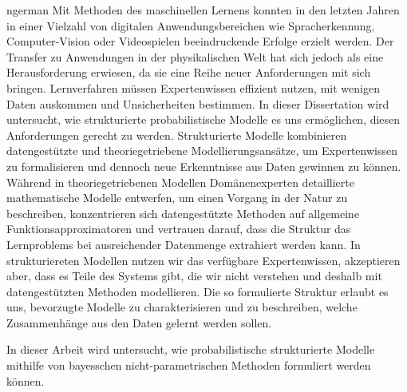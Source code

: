 \begin{titlepage}
    
\end{titlepage}

\begin{titlepage}
    
\end{titlepage}

\begin{Abstract}{ngerman}
    Mit Methoden des maschinellen Lernens konnten in den letzten Jahren in einer Vielzahl von digitalen Anwendungsbereichen wie Spracherkennung, Computer-Vision oder Videospielen beeindruckende Erfolge erzielt werden.
    Der Transfer zu Anwendungen in der physikalischen Welt hat sich jedoch als eine Herausforderung erwiesen, da sie eine Reihe neuer Anforderungen mit sich bringen.
    Lernverfahren müssen Expertenwissen effizient nutzen, mit wenigen Daten auskommen und Unsicherheiten bestimmen.
    In dieser Dissertation wird untersucht, wie strukturierte probabilistische Modelle es uns ermöglichen, diesen Anforderungen gerecht zu werden.
    Strukturierte Modelle kombinieren datengestützte und theoriegetriebene Modellierungsansätze, um Expertenwissen zu formalisieren und dennoch neue Erkenntnisse aus Daten gewinnen zu können.
    Während in theoriegetriebenen Modellen Domänenexperten detaillierte mathematische Modelle entwerfen, um einen Vorgang in der Natur zu beschreiben, konzentrieren sich datengestützte Methoden auf allgemeine Funktionsapproximatoren und vertrauen darauf, dass die Struktur das Lernproblems bei ausreichender Datenmenge extrahiert werden kann.
    In strukturiereten Modellen nutzen wir das verfügbare Expertenwissen, akzeptieren aber, dass es Teile des Systems gibt, die wir nicht verstehen und deshalb mit datengestützten Methoden modellieren.
    Die so formulierte Struktur erlaubt es uns, bevorzugte Modelle zu charakterisieren und zu beschreiben, welche Zusammenhänge aus den Daten gelernt werden sollen.

    In dieser Arbeit wird untersucht, wie probabilistische strukturierte Modelle mithilfe von bayesschen nicht-parametrischen Methoden formuliert werden können.

\end{Abstract}

